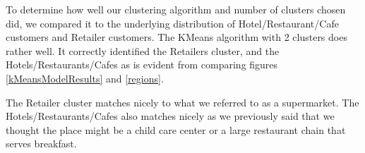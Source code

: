 \documentclass[twoside,openright,titlepage,numbers=noenddot,headinclude,%
               footinclude=true,cleardoublepage=empty,abstractoff,BCOR=5mm,%
               paper=a4,fontsize=11pt,ngerman,american]{scrreprt}
\numberwithin{theorem}{chapter}
\numberwithin{definition}{chapter}
\numberwithin{algorithm}{chapter}
\numberwithin{figure}{chapter}
\numberwithin{table}{chapter}
\numberwithin{equation}{chapter}
\begin{document}
To determine how well our clustering algorithm and number of clusters chosen did, we compared it to the underlying distribution of Hotel/Restaurant/Cafe customers and Retailer customers. The KMeans algorithm with 2 clusters does rather well. It correctly identified the Retailers cluster, and the Hotels/Restaurants/Cafes as is evident from comparing figures \ref{kMeansModelResults} and \ref{regions}.

The Retailer cluster matches nicely to what we referred to as a supermarket. The Hotels/Restaurants/Cafes also matches nicely as we previously said that we thought the place might be a child care center or a large restaurant chain that serves breakfast.
\end{document}
